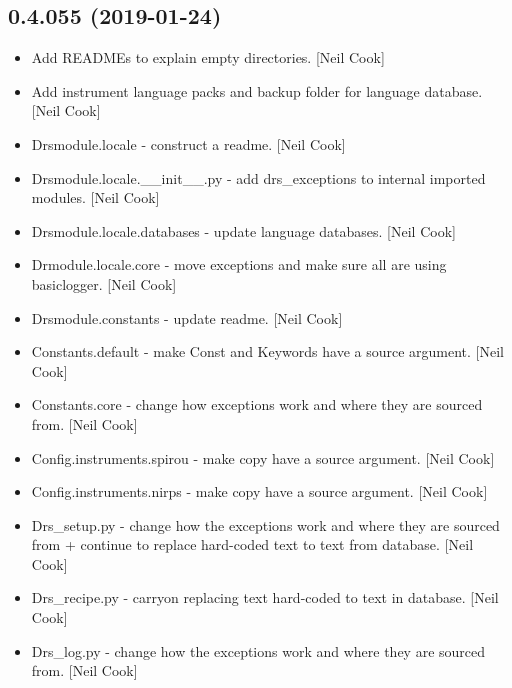 \documentclass[a4paper,10pt,english]{report}
\begin{document}
\subsection{0.4.055 (2019-01-24)}
\label{\detokenize{misc/changelog:id207}}\begin{itemize}
\item {} 
Add READMEs to explain empty directories. {[}Neil Cook{]}

\item {} 
Add instrument language packs and backup folder for language database.
{[}Neil Cook{]}

\item {} 
Drsmodule.locale - construct a readme. {[}Neil Cook{]}

\item {} 
Drsmodule.locale.\_\_init\_\_.py - add drs\_exceptions to internal imported
modules. {[}Neil Cook{]}

\item {} 
Drsmodule.locale.databases - update language databases. {[}Neil Cook{]}

\item {} 
Drmodule.locale.core - move exceptions and make sure all are using
basiclogger. {[}Neil Cook{]}

\item {} 
Drsmodule.constants - update readme. {[}Neil Cook{]}

\item {} 
Constants.default - make Const and Keywords have a source argument.
{[}Neil Cook{]}

\item {} 
Constants.core - change how exceptions work and where they are sourced
from. {[}Neil Cook{]}

\item {} 
Config.instruments.spirou - make copy have a source argument. {[}Neil
Cook{]}

\item {} 
Config.instruments.nirps - make copy have a source argument. {[}Neil
Cook{]}

\item {} 
Drs\_setup.py - change how the exceptions work and where they are
sourced from + continue to replace hard-coded text to text from
database. {[}Neil Cook{]}

\item {} 
Drs\_recipe.py - carryon replacing text hard-coded to text in database.
{[}Neil Cook{]}

\item {} 
Drs\_log.py - change how the exceptions work and where they are sourced
from. {[}Neil Cook{]}

\end{itemize}
\end{document}
